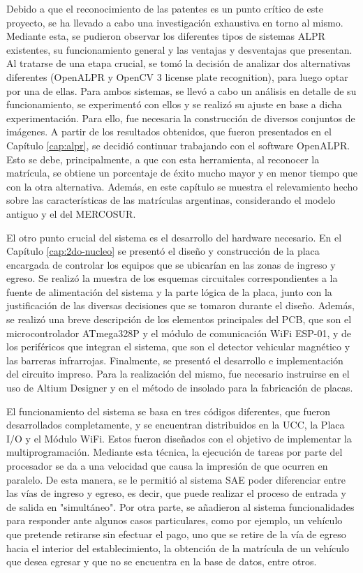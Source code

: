 Debido a que el reconocimiento de las patentes es un punto crítico de este proyecto, se ha llevado a cabo una investigación exhaustiva en torno al mismo. Mediante esta, se pudieron observar los diferentes tipos de sistemas ALPR existentes, su funcionamiento general y las ventajas y desventajas que presentan. Al tratarse de una etapa crucial, se tomó la decisión de analizar dos alternativas diferentes (OpenALPR y OpenCV 3 license plate recognition), para luego optar por una de ellas. Para ambos sistemas, se llevó a cabo un análisis en detalle de su funcionamiento, se experimentó con ellos y se realizó su ajuste en base a dicha experimentación. Para ello, fue necesaria la construcción de diversos conjuntos de imágenes. A partir de los resultados obtenidos, que fueron presentados en el Capítulo \ref{cap:alpr}, se decidió continuar trabajando con el software OpenALPR. Esto se debe, principalmente, a que con esta herramienta, al reconocer la matrícula, se obtiene un porcentaje de éxito mucho mayor y en menor tiempo que con la otra alternativa.  Además, en este capítulo se muestra el relevamiento hecho sobre las características de las matrículas argentinas, considerando el modelo antiguo y el del MERCOSUR.

El otro punto crucial del sistema es el desarrollo del hardware necesario. En el Capítulo \ref{cap:2do-nucleo} se presentó el diseño y construcción de la placa encargada de controlar los equipos que se ubicarían en las zonas de ingreso y egreso. Se realizó la muestra de los esquemas circuitales correspondientes a la fuente de alimentación del sistema y la parte lógica de la placa, junto con la justificación de las diversas decisiones que se tomaron durante el diseño. Además, se realizó una breve descripción de los elementos principales del PCB, que son el microcontrolador ATmega328P y el módulo de comunicación WiFi ESP-01, y de los periféricos que integran el sistema, que son el detector vehicular magnético y las barreras infrarrojas. Finalmente, se presentó el desarrollo e implementación del circuito impreso. Para la realización del mismo, fue necesario instruirse en el uso de Altium Designer y en el método de insolado para la fabricación de placas.

El funcionamiento del sistema se basa en tres códigos diferentes, que fueron desarrollados completamente, y se encuentran distribuidos en la UCC, la Placa I/O y el Módulo WiFi. Estos fueron diseñados con el objetivo de implementar la multiprogramación. Mediante esta técnica, la ejecución de tareas por parte del procesador se da a una velocidad que causa la impresión de que ocurren en paralelo. De esta manera, se le permitió al sistema SAE poder diferenciar entre las vías de ingreso y egreso, es decir, que puede realizar el proceso de entrada y de salida en "simultáneo". Por otra parte, se añadieron al sistema funcionalidades para responder ante algunos casos particulares, como por ejemplo, un vehículo que pretende retirarse sin efectuar el pago, uno que se retire de la vía de egreso hacia el interior del establecimiento, la obtención de la matrícula de un vehículo que desea egresar y que no se encuentra en la base de datos, entre otros.

